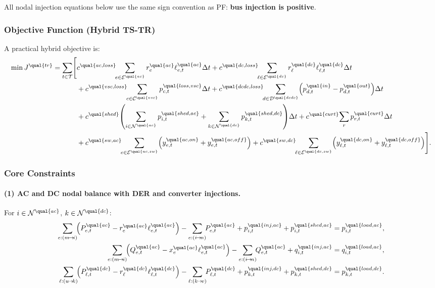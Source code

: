All nodal injection equations below use the same sign convention as PF:
\textbf{bus injection is positive}.

\subsubsection{Objective Function (Hybrid TS-TR)}

A practical hybrid objective is:
\begin{align}
\min J^{\qual{tr}} = \sum_{t\in\mathcal{T}}
\Biggl[
&c^{\qual{ac,loss}} \!\!\sum_{e\in\mathcal{E}^{\qual{ac}}}
r^{\qual{ac}}_e \ell^{\qual{ac}}_{e,t}\Delta t
+c^{\qual{dc,loss}} \!\!\sum_{\ell\in\mathcal{E}^{\qual{dc}}}
r^{\qual{dc}}_\ell \ell^{\qual{dc}}_{\ell,t}\Delta t \notag\\
&+c^{\qual{vsc,loss}} \!\!\sum_{c\in\mathcal{C}^{\qual{vsc}}}
p^{\qual{loss,vsc}}_{c,t}\Delta t
+c^{\qual{dcdc,loss}} \!\!\sum_{d\in\mathcal{D}^{\qual{dcdc}}}
\!\left(p^{\qual{in}}_{d,t}-p^{\qual{out}}_{d,t}\right)\!\Delta t \notag\\
&+c^{\qual{shed}}
\!\left(\sum_{i\in\mathcal{N}^{\qual{ac}}}p^{\qual{shed,ac}}_{i,t}
+\sum_{k\in\mathcal{N}^{\qual{dc}}}p^{\qual{shed,dc}}_{k,t}\right)\!\Delta t
+c^{\qual{curt}}\!\sum_{r}p^{\qual{curt}}_{r,t}\Delta t \notag\\
&+c^{\qual{sw,ac}}\!\!\sum_{e\in\mathcal{E}^{\qual{ac,sw}}}
\!\left(y^{\qual{ac,on}}_{e,t}+y^{\qual{ac,off}}_{e,t}\right)
+c^{\qual{sw,dc}}\!\!\sum_{\ell\in\mathcal{E}^{\qual{dc,sw}}}
\!\left(y^{\qual{dc,on}}_{\ell,t}+y^{\qual{dc,off}}_{\ell,t}\right)
\Biggr].
\label{eq:tstr-h-obj}
\end{align}

\subsubsection{Core Constraints}

\paragraph{(1) AC and DC nodal balance with DER and converter injections.}
For \(i\in\mathcal{N}^{\qual{ac}}\), \(k\in\mathcal{N}^{\qual{dc}}\):
\begin{align}
\sum_{e:(m\!\to\! i)}\!\!\left(P^{\qual{ac}}_{e,t}-r^{\qual{ac}}_e\ell^{\qual{ac}}_{e,t}\right)
-\sum_{e:(i\!\to\! n)}\!\!P^{\qual{ac}}_{e,t}
+p^{\qual{inj,ac}}_{i,t}
+p^{\qual{shed,ac}}_{i,t}
&= p^{\qual{load,ac}}_{i,t},
\label{eq:tstr-h-ac-balance-p}
\\
\sum_{e:(m\!\to\! i)}\!\!\left(Q^{\qual{ac}}_{e,t}-x^{\qual{ac}}_e\ell^{\qual{ac}}_{e,t}\right)
-\sum_{e:(i\!\to\! n)}\!\!Q^{\qual{ac}}_{e,t}
+q^{\qual{inj,ac}}_{i,t}
&= q^{\qual{load,ac}}_{i,t},
\label{eq:tstr-h-ac-balance-q}
\\
\sum_{\ell:(u\!\to\! k)}\!\!\left(P^{\qual{dc}}_{\ell,t}-r^{\qual{dc}}_\ell\ell^{\qual{dc}}_{\ell,t}\right)
-\sum_{\ell:(k\!\to\! v)}\!\!P^{\qual{dc}}_{\ell,t}
+p^{\qual{inj,dc}}_{k,t}
+p^{\qual{shed,dc}}_{k,t}
&= p^{\qual{load,dc}}_{k,t}.
\label{eq:tstr-h-dc-balance-p}
\end{align}


